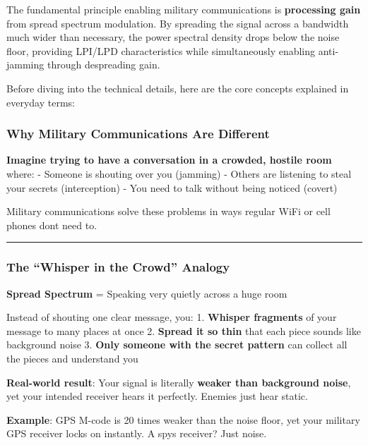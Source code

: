 \begin{keyconcept}
The fundamental principle enabling military communications is \textbf{processing gain} from spread spectrum modulation. By spreading the signal across a bandwidth much wider than necessary, the power spectral density drops below the noise floor, providing LPI/LPD characteristics while simultaneously enabling anti-jamming through despreading gain.
\end{keyconcept}

Before diving into the technical details, here are the core concepts explained in everyday terms:

\subsubsection{Why Military Communications Are
Different}\label{why-military-communications-are-different}

\textbf{Imagine trying to have a conversation in a crowded, hostile
room} where: - Someone is shouting over you (jamming) - Others are
listening to steal your secrets (interception) - You need to talk
without being noticed (covert)

Military communications solve these problems in ways regular WiFi or
cell phones don\textquotesingle t need to.

\begin{center}\rule{0.5\linewidth}{0.5pt}\end{center}

\subsubsection{The ``Whisper in the Crowd''
Analogy}\label{the-whisper-in-the-crowd-analogy}

\textbf{Spread Spectrum} = Speaking very quietly across a huge room

Instead of shouting one clear message, you: 1. \textbf{Whisper
fragments} of your message to many places at once 2. \textbf{Spread it
so thin} that each piece sounds like background noise 3. \textbf{Only
someone with the secret pattern} can collect all the pieces and
understand you

\textbf{Real-world result}: Your signal is literally \textbf{weaker than
background noise}, yet your intended receiver hears it perfectly.
Enemies just hear static.

\textbf{Example}: GPS M-code is 20 times weaker than the noise floor,
yet your military GPS receiver locks on instantly. A
spy\textquotesingle s receiver? Just noise.

